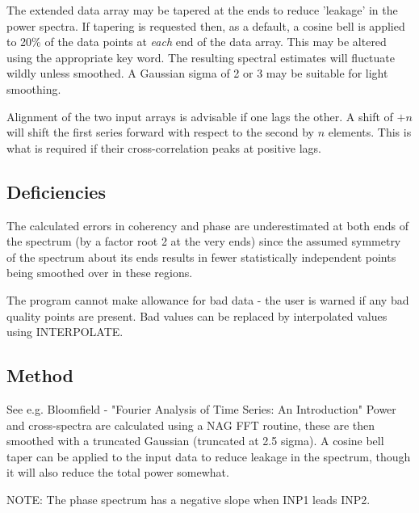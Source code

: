 \documentclass{book}
\renewcommand{\_}{{\tt\char'137}}     %
\begin{document}
The extended data array may be tapered at the ends to reduce
'leakage' in the power spectra. If tapering is requested then,
as a default, a cosine bell is applied to 20\% of the data points
at {\em each} end of the data array. This may be altered using the
appropriate key word. The resulting spectral estimates will
fluctuate wildly unless smoothed. A Gaussian sigma of 2 or 3 may
be suitable for light smoothing.

Alignment of the two input arrays is advisable if one lags the
other. A shift of $+n$ will shift the first series forward with
respect to the second by $n$ elements. This is what is required if
their cross-correlation peaks at positive lags.

\subsection{Deficiencies}
The calculated errors in coherency and phase are underestimated
at both ends of the spectrum (by a factor root 2 at the very
ends) since the assumed symmetry of the spectrum about its ends
results in fewer statistically independent points being smoothed
over in these regions.

The program cannot make allowance for bad data - the user is
warned if any bad quality points are present. Bad values can be
replaced by interpolated values using INTERPOLATE.

\subsection{Method}
See e.g. Bloomfield - "Fourier Analysis of Time Series: An
Introduction" Power and cross-spectra are calculated using a NAG
FFT routine, these are then smoothed with a truncated Gaussian
(truncated at 2.5 sigma). A cosine bell taper can be applied to
the input data to reduce leakage in the spectrum, though it will
also reduce the total power somewhat.

NOTE: The phase spectrum has a negative slope when INP1
leads INP2.
\end{document}
